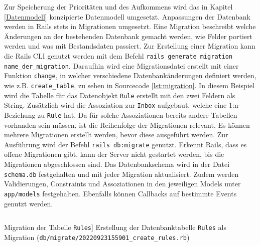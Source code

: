 \noindent Zur Speicherung der Prioritäten und des Aufkommens wird das in Kapitel \ref{Datenmodell} konzipierte Datenmodell umgesetzt. Anpassungen der Datenbank werden in Rails stets in Migrationen umgesetzt. Eine Migration beschreibt welche Änderungen an der bestehenden Datenbank gemacht werden, wie Felder portiert werden und was mit Bestandsdaten passiert. Zur Erstellung einer Migration kann die Rails CLI genutzt werden mit dem Befehl \texttt{rails generate migration name\_der\_migration}. Daraufhin wird eine Migrationsdatei erstellt mit einer Funktion \texttt{change}, in welcher verschiedene Datenbankänderungen definiert werden, wie z.B. \texttt{create\_table}, zu sehen in Sourcecode \ref{lst:migration}. In diesem Beispiel wird die Tabelle für das Datenobjekt \texttt{Rule} erstellt mit den zwei Feldern als String. Zusätzlich wird die Assoziation zur \texttt{Inbox} aufgebaut, welche eine 1:n-Beziehung zu \texttt{Rule} hat. Da für solche Assoziationen bereits andere Tabellen vorhanden sein müssen, ist die Reihenfolge der Migrationen relevant. Es können mehrere Migrationen erstellt werden, bevor diese ausgeführt werden. Zur Ausführung wird der Befehl \texttt{rails db:migrate} genutzt. Erkennt Rails, dass es offene Migrationen gibt, kann der Server nicht gestartet werden, bis die Migrationen abgeschlossen sind. Das Datenbankschema wird in der Datei \texttt{schema.db} festgehalten und mit jeder Migration aktualisiert. Zudem werden Validierungen, Constraints und Assoziationen in den jeweiligen Models unter \texttt{app/models} festgehalten. Ebenfalls können Callbacks auf bestimmte Events genutzt werden.

\begin{listing}[!ht]
\inputminted[linenos]{ruby}{Listings/Pkg1/20220923155901_create_rules.rb}

\caption
    [Migration der Tabelle \texttt{Rules}]
    {Erstellung der Datenbanktabelle \texttt{Rules} als Migration (\texttt{db/migrate/20220923155901\_create\_rules.rb})}

\label{lst:migration}
\end{listing}

